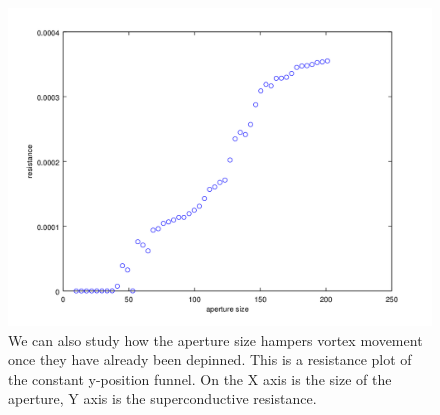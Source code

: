 \begin{figure}[htbp]
\begin{center}
\includegraphics[scale=.50]{AvR.png}
\caption{ We can also study how the aperture size hampers vortex movement once they have already been depinned. This is a resistance plot of the constant y-position funnel. On the X axis is the size of the aperture, Y axis is the superconductive resistance. }
\label{AvR}
\end{center}
\end{figure}


